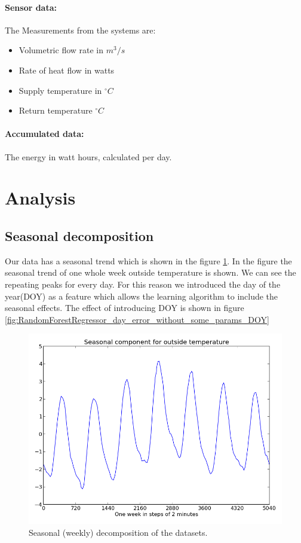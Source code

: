 \documentclass{scrartcl}
\begin{document}
\paragraph{Sensor data:}
The Measurements from the systems are:

\begin{itemize}
\item Volumetric flow rate in $m^3 / s$
\item Rate of heat flow in watts
\item Supply temperature in $^\circ C$
\item Return temperature $^\circ C$
\end{itemize}

\paragraph{Accumulated data:}
The energy in watt hours, calculated per day.

\section{Analysis}
\label{sec:analysis}
\subsection{Seasonal decomposition}
Our data has a seasonal trend which is shown in the figure \ref{fig:season_outside_temperature}. In the figure the seasonal trend of one whole week outside temperature is shown. We can see the repeating peaks for every day. For this reason we introduced the day of the year(DOY) as a feature which allows the learning algorithm to include the seasonal effects. The effect of introducing DOY is shown in figure \ref{fig:RandomForestRegressor_day_error_without_some_params_DOY}

\begin{figure}[H]
  \center
  \includegraphics[width=0.6\linewidth]{img/season-outside_temperature.png}
  \caption{Seasonal (weekly) decomposition of the datasets.}
  \label{fig:season_outside_temperature}
\end{figure}
\end{document}
